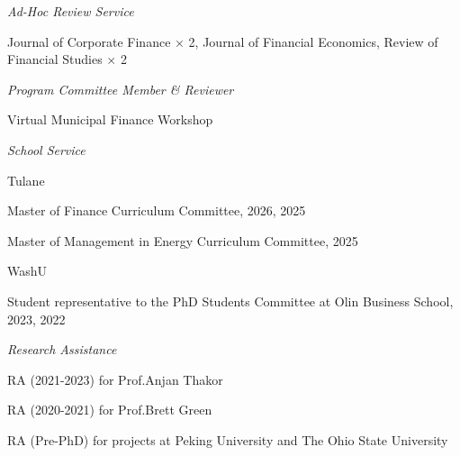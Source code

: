 \documentclass[11pt]{article}
\renewenvironment{itemize}{
  \begin{list}{}{
    \setlength{\leftmargin}{1.5em}
  }
}{
  \end{list}
}
\begin{document}
\begin{itemize}

\item {\textit{Ad-Hoc Review Service}}
\vspace{-0.5em}
\begin{itemize}
\item Journal of Corporate Finance $\times$ 2, Journal of Financial Economics, Review of Financial Studies $\times$ 2
\end{itemize}

\vspace{-0.5em}
\item {\textit{Program Committee Member \& Reviewer}}
\vspace{-0.5em}
\begin{itemize}
\item Virtual Municipal Finance Workshop
\end{itemize}

\vspace{-0.5em}
\item {\textit{School Service}}
\vspace{-0.5em}
\begin{itemize}
\item Tulane
\begin{itemize}
\item Master of Finance Curriculum Committee, 2026, 2025
\item Master of Management in Energy Curriculum Committee, 2025
\end{itemize}
\item WashU
\begin{itemize}
\item Student representative to the PhD Students Committee at Olin Business School, 2023, 2022
\end{itemize}
\end{itemize}

\vspace{-0.5em}
\item {\textit{Research Assistance}}
\vspace{-0.5em}
\begin{itemize}
\item RA (2021-2023) for Prof.\;Anjan Thakor
\item RA (2020-2021) for Prof.\;Brett Green
\item RA (Pre-PhD) for projects at Peking University and The Ohio State University
\end{itemize}

\end{itemize}
\end{document}
